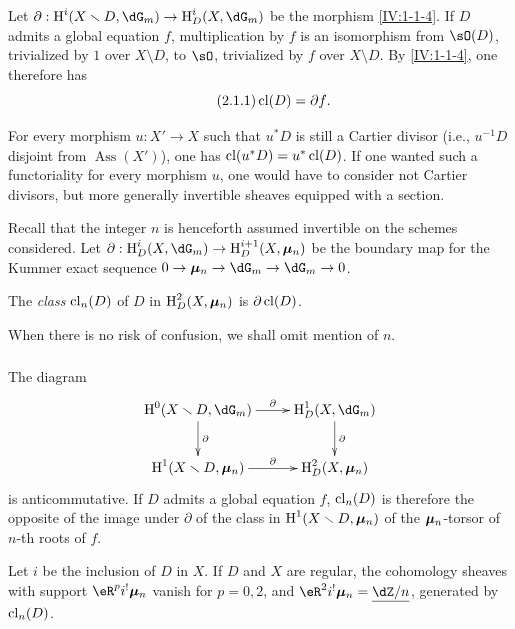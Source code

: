 Let $\partial:\h^i(X\setminus D,\dG_m)\to \h_D^i(X,\dG_m)$ be the morphism
\ref{IV:1-1-4}. If $D$ admits a global equation $f$, multiplication by
$f$ is an isomorphism from $\sO(D)$, trivialized by $1$ over $X\setminus D$,
to $\sO$, trivialized by $f$ over $X\setminus D$. By \ref{IV:1-1-4},
one therefore has
\begin{equation*}\tag{2.1.1}\label{IV:eq:2-1-1}
  \operatorname{cl}(D) = \partial f \text{.}
\end{equation*}

For every morphism $u:X'\to X$ such that $u^* D$ is still a Cartier divisor
(i.e., $u^{-1} D$ disjoint from $\operatorname{Ass}(X')$), one has
$\operatorname{cl}(u^* D) = u^*\operatorname{cl}(D)$. If one wanted such a
functoriality for every morphism $u$, one would have to consider not
Cartier divisors, but more generally invertible sheaves
equipped with a section.

Recall that the integer $n$ is henceforth assumed invertible on the
schemes considered. Let
$\partial:\h_D^i(X,\dG_m) \to \h_D^{i+1}(X,\dmu_n)$ be the boundary map for the
Kummer exact sequence $0 \to \dmu_n \to \dG_m \to \dG_m \to 0$.




\begin{definition}\label{IV:2-1-2}
The \emph{class $\operatorname{cl}_n(D)$} of $D$ in $\operatorname{H}_D^2(X,{\bm\mu}_n)$ is
$\partial \operatorname{cl}(D)$.
\end{definition}

When there is no risk of confusion, we shall omit mention of $n$.




\subsubsection{}\label{IV:2-1-3}

The diagram
\[\xymatrix{
  \h^0(X\setminus D,\dG_m) \ar[r]^-\partial \ar[d]^-\partial
    & \h_D^1(X,\dG_m) \ar[d]^-\partial \\
  \h^1(X\setminus D,\dmu_n) \ar[r]^-\partial
    & \h_D^2(X,\dmu_n)
}\]
is anticommutative. If $D$ admits a global equation $f$,
$\operatorname{cl}_n(D)$ is therefore the opposite of the image under $\partial$ of the
class in $\operatorname{H}^1(X\smallsetminus D,{\bm\mu}_n)$ of the ${\bm\mu}_n$-torsor of $n$-th
roots of $f$.




\begin{proposition}\label{IV:2-1-4}
Let $i$ be the inclusion of $D$ in $X$. If $D$ and $X$ are regular, the
cohomology sheaves with support $\eR^p i^! \dmu_n$ vanish for $p=0,2$,
and $\eR^2 i^!\dmu_n = \underline{\dZ/n}$, generated by
$\operatorname{cl}_n(D)$.
\end{proposition}

